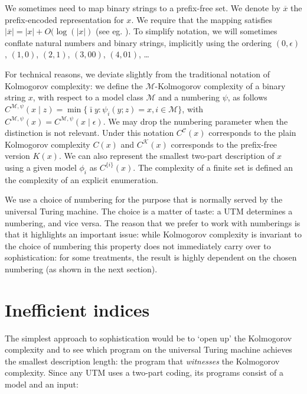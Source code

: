 \documentclass{style/llncs}
\newcommand{\M}{\mathscr M}
\newcommand{\C}{\mathscr C}
\newcommand{\K}{\mathscr K}
\newcommand{\br}[1]{\overline{#1}}
\begin{document}
We sometimes need to map binary strings to a prefix-free set. We denote by $\br{x}$ the prefix-encoded representation for $x$. We require that the mapping satisfies $|\br{x}| = |x|+O(\log(|x|)$ (see eg. \cite[Section~1.4]{li1993introduction}). To simplify notation, we will sometimes conflate natural numbers and binary strings, implicitly using the ordering $(0, \epsilon)$, $(1, 0)$, $(2, 1)$, $(3, 00)$, $(4, 01)$, \ldots  

For technical reasons, we deviate slightly from the traditional notation of Kolmogorov complexity: we define the $\M$-Kolmogorov complexity of a binary string $x$, with respect to a model class $\M$ and a numbering $\psi$, as follows $C^{\M,\psi}(x\mid z)=\min\{\bar\imath y:\psi_i(y; z)=x,i\in\M\}$, with $C^{\M,\psi}(x) = C^{\M,\psi}(x\mid \epsilon)$. We may drop the numbering parameter when the distinction is not relevant. Under this notation $C^\C(x)$ corresponds to the plain Kolmogorov complexity $C(x)$ and $C^\K(x)$ corresponds to the prefix-free version $K(x)$. We can also represent the smallest two-part description of $x$ using a given model $\phi_i$ as $C^{\{i\}}(x)$. The complexity of a finite set is defined an the complexity of an explicit enumeration.

We use a choice of numbering for the purpose that is normally served by the universal Turing machine. The choice is a matter of taste: a UTM determines a numbering, and vice versa. The reason that we prefer to work with numberings is that it highlights an important issue: while Kolmogorov complexity is invariant to the choice of numbering this property does not immediately carry over to sophistication: for some treatments, the result is highly dependent on the chosen numbering (as shown in the next section). 
 
\section{Inefficient indices}
\label{section:indices}

The simplest approach to sophistication would be to `open up' the Kolmogorov complexity and to see which program on the universal Turing machine achieves the smallest description length: the program that \emph{witnesses} the Kolmogorov complexity. Since any UTM uses a two-part coding, its programs consist of a model and an input:
\end{document}
